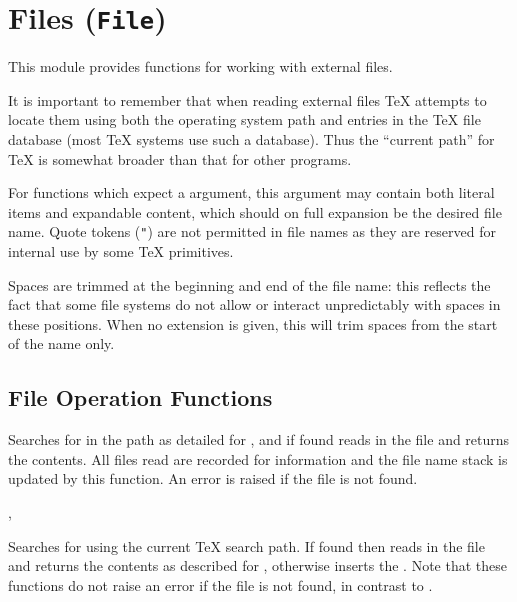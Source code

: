 \documentclass[oneside]{book}
\begin{document}
\chapter{Files (\texttt{File})}

This module provides functions for working with external files.

It is important to remember that when reading external files \TeX{}
attempts to locate them using both the operating system path and entries in the
\TeX{} file database (most \TeX{} systems use such a database). Thus the
\enquote{current path} for \TeX{} is somewhat broader than that for other
programs.

For functions which expect a  argument, this argument
may contain both literal items and expandable content, which should on
full expansion be the desired file name.
Quote tokens (\verb|"|) are not permitted in file names as they are reserved
for internal use by some \TeX{} primitives.

Spaces are trimmed at the beginning and end of the file name:
this reflects the fact that some file systems do not allow or interact
unpredictably with spaces in these positions. When no extension is given,
this will trim spaces from the start of the name only.

\section{File Operation Functions}

\begin{function}{\FileInput}
\begin{syntax}
 
\end{syntax}
Searches for  in the path as detailed for
, and if found reads in the file and
returns the contents. All files read are recorded
for information and the file name stack is updated by this
function. An error is raised if the file is not found.
\end{function}

\begin{function}{\FileIfExistInput,\FileIfExistInputF}
\begin{syntax}
 
  
\end{syntax}
Searches for  using the current \TeX{} search path.
If found then reads in the file and returns the contents as described
for , otherwise inserts the .
Note that these functions do not raise
an error if the file is not found, in contrast to .
\end{function}
\end{document}

